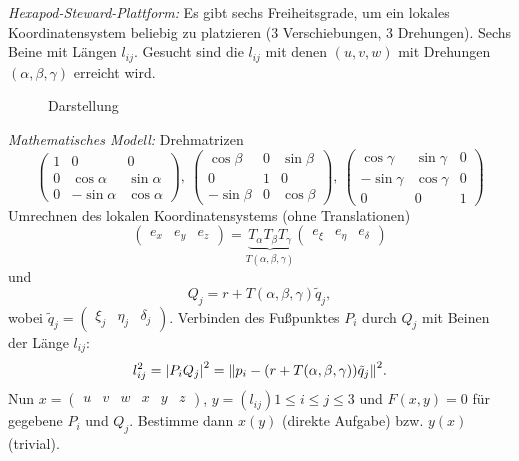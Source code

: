 \begin{example}
    \emph{Hexapod-Steward-Plattform:} Es gibt sechs Freiheitsgrade, um ein lokales Koordinatensystem beliebig zu platzieren (3 Verschiebungen, 3 Drehungen).
    Sechs Beine mit Längen $l_{ij}$.
    Gesucht sind die $l_{ij}$ mit denen $(u,v,w)$ mit Drehungen $(\alpha,\beta,\gamma)$ erreicht wird. 
    \begin{figure}%
        \centering
        
        \caption{Darstellung}
    \end{figure}
    
    \emph{Mathematisches Modell:} Drehmatrizen
    $$
    \begin{pmatrix}
        1 & 0 & 0\\
        0 & \cos\alpha & \sin\alpha\\
        0 & -\sin\alpha & \cos\alpha
    \end{pmatrix},\
    \begin{pmatrix}
        \cos\beta & 0 & \sin\beta\\
        0 & 1 & 0\\
        -\sin\beta & 0 & \cos\beta
    \end{pmatrix},\
    \begin{pmatrix}
        \cos\gamma & \sin\gamma & 0\\
        -\sin\gamma & \cos\gamma & 0\\
        0 & 0 & 1
    \end{pmatrix}
    $$
    Umrechnen des lokalen Koordinatensystems (ohne Translationen)
    $$
    \begin{pmatrix}
        e_x & e_y & e_z
    \end{pmatrix}
    =
    \underbrace{T_{\alpha}T_{\beta}T_{\gamma}}_{T(\alpha,\beta,\gamma)}
    \begin{pmatrix}
        e_{\xi} & e_{\eta} & e_{\delta}
    \end{pmatrix}
    $$
    und
    $$
    Q_j=r+T(\alpha,\beta,\gamma)\tilde q_j,
    $$
    wobei $\tilde q_j=
    \begin{pmatrix}
        \xi_j & \eta_j & \delta_j
    \end{pmatrix}
    $.
    Verbinden des Fußpunktes $P_i$ durch $Q_j$ mit Beinen der Länge $l_{ij}$:
    $$
    l_{ij}^2={\left|P_i Q_j\right|}^2={\left\Vert p_i-(r+T(\alpha,\beta,\gamma))\tilde q_j \right\Vert}^2.
    $$
    Nun $x=
    \begin{pmatrix}
        u & v & w & x & y & z
    \end{pmatrix}$, $y={(l_{ij})}{1\leq i\leq j\leq 3}$ und $F(x,y)=0$ für gegebene $P_i$ und $Q_j$. Bestimme dann $x(y)$ (direkte Aufgabe) bzw. $y(x)$ (trivial).
\end{example}

